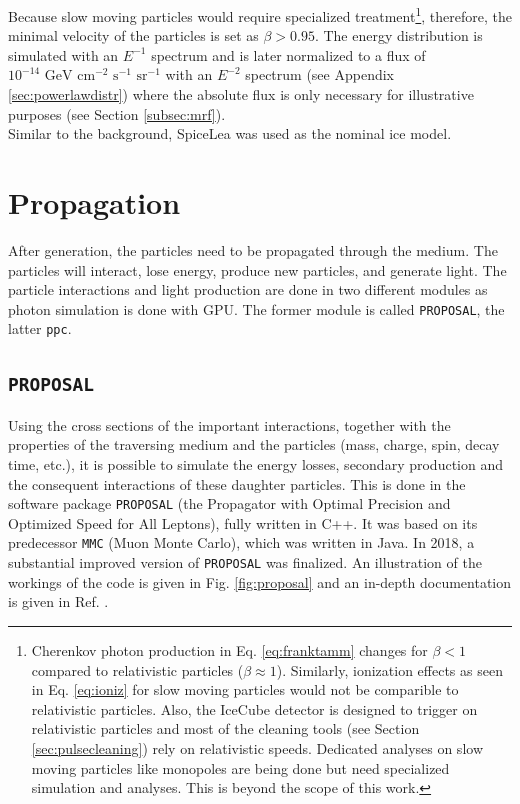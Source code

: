\noindent Because slow moving particles would require specialized treatment\footnote{Cherenkov photon production in Eq. \ref{eq:franktamm} changes for $\beta < 1$ compared to relativistic particles ($\beta \approx 1$). Similarly, ionization effects as seen in Eq. \ref{eq:ioniz} for slow moving particles would not be comparible to relativistic particles. Also, the IceCube detector is designed to trigger on relativistic particles and most of the cleaning tools (see Section \ref{sec:pulsecleaning}) rely on relativistic speeds. Dedicated analyses on slow moving particles like monopoles are being done but need specialized simulation and analyses. This is beyond the scope of this work.}, therefore, the minimal velocity of the particles is set as $\beta > 0.95$. The energy distribution is simulated with an $E^{-1}$ spectrum and is later normalized to a flux of $10^{-14} \textrm{ GeV } \textrm{cm}^{-2} \textrm{ s}^{-1} \textrm{ sr}^{-1}$ with an $E^{-2}$ spectrum (see Appendix \ref{sec:powerlawdistr}) where the absolute flux is only necessary for illustrative purposes (see Section \ref{subsec:mrf}).\\

\noindent Similar to the background, SpiceLea was used as the nominal ice model.

\section{Propagation}
After generation, the particles need to be propagated through the medium. The particles will interact, lose energy, produce new particles, and generate light. The particle interactions and light production are done in two different modules as photon simulation is done with GPU. The former module is called \texttt{PROPOSAL}, the latter \texttt{ppc}.




\subsection{\texttt{PROPOSAL}}
Using the cross sections of the important interactions, together with the properties of the traversing medium and the particles (mass, charge, spin, decay time, etc.), it is possible to simulate the energy losses, secondary production and the consequent interactions of these daughter particles. This is done in the software package \texttt{PROPOSAL}  (the Propagator with Optimal Precision and Optimized Speed for All Leptons), fully written in C++. It was based on its predecessor \texttt{MMC} (Muon Monte Carlo), which was written in Java. In 2018, a substantial improved version of \texttt{PROPOSAL} was finalized. An illustration of the workings of the code is given in Fig. \ref{fig:proposal} and an in-depth documentation is given in Ref. \cite{Dunsch:2018nsc}.

